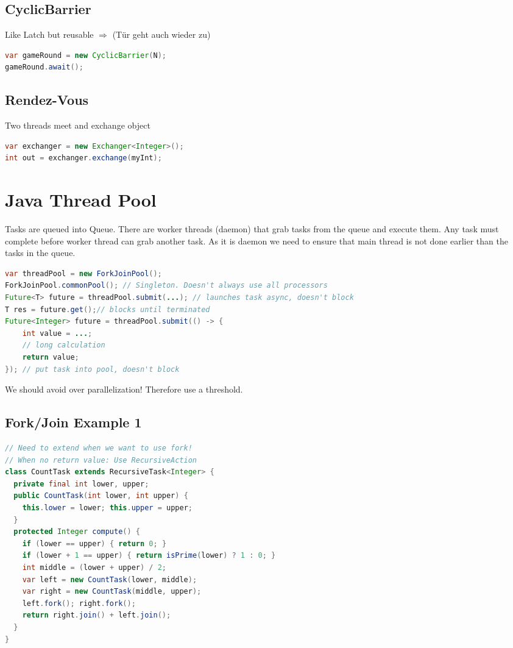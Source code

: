 \begin{multicols*}{4}
    \subsection{CyclicBarrier}
    Like Latch but reusable $\Rightarrow$ (Tür geht auch wieder zu)
    \begin{lstlisting}[language=java]
var gameRound = new CyclicBarrier(N);
gameRound.await();
\end{lstlisting}

    \subsection{Rendez-Vous}
    Two threads meet and exchange object
    \begin{lstlisting}[language=java]
var exchanger = new Exchanger<Integer>();
int out = exchanger.exchange(myInt);
\end{lstlisting}

\section{Java Thread Pool}
	Tasks are queued into Queue. There are worker threads (daemon) that grab tasks from the queue and execute them. Any task must complete before worker thread can grab another task. As it is daemon we need to ensure that main thread is not done earlier than the tasks in the queue.

    \begin{lstlisting}[language=java]
var threadPool = new ForkJoinPool();
ForkJoinPool.commonPool(); // Singleton. Doesn't always use all processors
Future<T> future = threadPool.submit(...); // launches task async, doesn't block
T res = future.get();// blocks until terminated
Future<Integer> future = threadPool.submit(() -> {
    int value = ...;
    // long calculation
    return value;
}); // put task into pool, doesn't block
\end{lstlisting}
    We should avoid over parallelization! Therefore use a threshold.

    \subsection{Fork/Join Example 1}
    \begin{lstlisting}[language=java]
// Need to extend when we want to use fork!
// When no return value: Use RecursiveAction
class CountTask extends RecursiveTask<Integer> {
  private final int lower, upper;
  public CountTask(int lower, int upper) {
    this.lower = lower; this.upper = upper;
  }
  protected Integer compute() {
    if (lower == upper) { return 0; }
    if (lower + 1 == upper) { return isPrime(lower) ? 1 : 0; }
    int middle = (lower + upper) / 2;
    var left = new CountTask(lower, middle);
    var right = new CountTask(middle, upper);
    left.fork(); right.fork();
    return right.join() + left.join();
  }
}
\end{lstlisting}


\end{multicols*}

